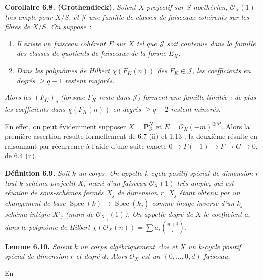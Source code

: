 \textbf{Corollaire 6.8. (Grothendieck).} \emph{Soient $X$ projectif sur $S$ noeth\'erien, $\mathcal O_X(1)$ tr\`es ample pour $X/S$, et $\mathcal J$ une famille de classes de faisceaux coh\'erents sur les fibres de $X/S$. On suppose}~:
\begin{enumerate}[label=(\alph*)]
\item \emph{Il existe un faisceau coh\'erent $E$ sur $X$ tel que $\mathcal J$ soit contenue dans la famille des classes de quotients de faisceaux de la forme $E_K$.}
\item[$(b_q)$] \emph{Dans les polyn\^omes de Hilbert $\chi(F_K(n))$ des $F_K\in\mathcal J$, les coefficients en degr\'es $\ge q-1$ restent major\'es.}
\end{enumerate}
\emph{Alors les $(F_K)_q$ (lorsque $F_K$ reste dans $\mathcal J$) forment une famille limit\'ee ; de plus les coefficients dans $\chi(F_K(n))$ en degr\'es $\ge q-2$ restent minor\'es.}

En effet, on peut \'evidemment supposer $X=\mathbf P^N_S$ et $E=\mathcal O_X(-m)^{\oplus M}$. Alors la premi\`ere assertion r\'esulte formellement de 6.7 (ii) et 1.13 ; la deuxi\`eme r\'esulte en raisonnant par r\'ecurrence \`a l'aide d'une suite exacte $0\to F(-1)\to F\to G\to0$, de 6.4 (ii).

\textbf{D\'efinition 6.9.} \emph{Soit $k$ un corps. On appelle \emph{$k$-cycle positif sp\'ecial de dimension $r$} tout $k$-sch\'ema projectif $X$, muni d'un faisceau $\mathcal O_X(1)$ tr\`es ample, qui est r\'eunion de sous-sch\'emas ferm\'es $X_j$ de dimension $r$, $X_j$ \'etant obtenu par un changement de base $\operatorname{Spec}(k)\to\operatorname{Spec}(k_j)$ comme image inverse d'un $k_j$-sch\'ema int\`egre $X'_j$ (muni de $\mathcal O_{X'_j}(1)$). On appelle \emph{degr\'e} de $X$ le coefficient $a_r$ dans le polyn\^ome de Hilbert $\chi(\mathcal O_X(n))=\sum a_i\binom{n+i}{i}$.}

\textbf{Lemme 6.10.} \emph{Soient $k$ un corps alg\'ebriquement clos et $X$ un $k$-cycle positif sp\'ecial de dimension $r$ et degr\'e $d$. Alors $\mathcal O_X$ est un $(0,\ldots,0,d)$-faisceau.}

En
